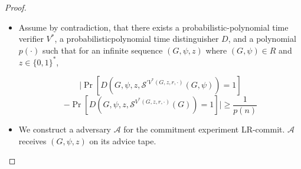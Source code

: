 \documentclass{beamer}
\begin{document}
    \begin{frame}
        \frametitle{}
    
        \begin{proof}
            \begin{itemize}
                \item             Assume by contradiction, that there exists a probabilistic-polynomial time verifier $V^{*}$, a probabilisticpolynomial time distinguisher $D$, and a polynomial $p(\cdot)$ such that for an infinite sequence $(G, \psi, z)$ where $(G, \psi) \in R$ and $z \in\{0,1\}^{*}$,

                $$
                    |\operatorname{Pr}\left[D\left(G, \psi, z,{\mathcal{S}}^{\prime V^{*}(G, z, r, \cdot)}(G, \psi)\right)=1\right]
                $$
                $$
                -\operatorname{Pr}\left[D\left(G, \psi, z, \mathcal{S}^{V^{*}(G, z, r, \cdot)}(G)\right)=1\right]| \geq \frac{1}{p(n)}
                $$
                \item We construct a adversary $\mathcal{A}$ for the commitment experiment LR-commit. $\mathcal{A}$ receives $(G, \psi, z)$ on its advice tape.
            \end{itemize}

           
            
        \end{proof}
    
    \end{frame}
\end{document}
